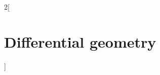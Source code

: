 \documentclass[../../../main.tex]{subfiles}
\begin{document}
\begin{multicols}{2}[\section{Differential geometry}]

\end{multicols}
\end{document}
